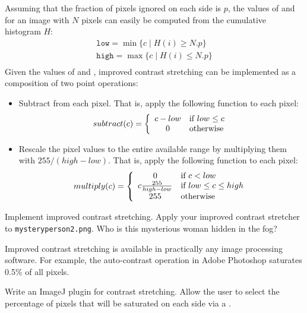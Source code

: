\documentclass{book}
\begin{document}
Assuming that the fraction of pixels ignored on each side is $p$, the values of  and  for an image with $N$ pixels can easily be computed from the cumulative histogram $H$:
$$\begin{array}{c}
\mathtt{low} = \min \{ c \mid H(i) \geq N.p \} \\
\mathtt{high} = \max \{ c \mid H(i) \leq N.p \} \\
\end{array}$$
Given the values of  and , improved contrast stretching can be implemented as a composition of two point operations:
\begin{itemize}
  \item Subtract  from each pixel. That is, apply the following function to each pixel:
$$subtract(c) = \left\{\begin{array}{c l}
  c - {low} & \text{if ${low} \leq {c}$}\\
  0 & \text{otherwise}\\
\end{array}
\right.$$
  \item Rescale the pixel values to the entire available range by multiplying them with $255 / ({high} - {low})$. That is, apply the following function to each pixel:
$$multiply(c) = \left\{\begin{array}{c l}
  0 & \text{if $c < {low}$}\\
  c \frac{255}{{high} - {low}} & \text{if ${low} \leq c \leq {high}$}\\
  255 & \text{otherwise}\\
\end{array}
\right.$$
\end{itemize}

\begin{exercise}
Implement improved contrast stretching. Apply your improved contrast stretcher to \texttt{mysteryperson2.png}.  Who is this mysterious woman hidden in the fog?
\end{exercise}

Improved contrast stretching is available in practically any image processing software. For example, the auto-contrast operation in Adobe Photoshop saturates 0.5\% of all pixels.

\begin{exercise}
Write an ImageJ plugin for contrast stretching. Allow the user to select the percentage of pixels that will be saturated on each side via a .
\end{exercise}
\end{document}

